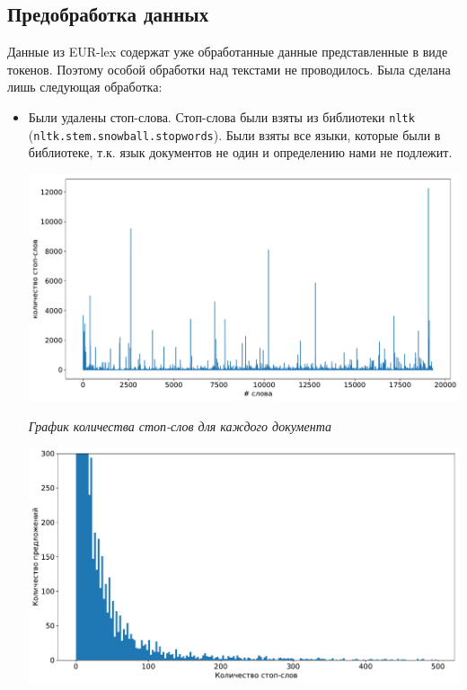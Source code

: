 \documentclass[12pt, a4paper]{article}
\begin{document}
        \subsection{Предобработка данных}
            Данные из EUR-lex содержат уже обработанные данные представленные в виде токенов. Поэтому особой обработки над текстами не проводилось. Была сделана лишь следующая обработка:
            \begin{itemize}
                \item Были удалены стоп-слова. Стоп-слова были взяты из библиотеки \verb|nltk|\\
                (\verb|nltk.stem.snowball.stopwords|). Были взяты все языки, которые были в библиотеке, т.к. язык документов не один и определению нами не подлежит.

                \begin{singlespace}
                    \begin{center}
                        \includegraphics[width=17cm]{diff.pdf}

                        \textit{График количества стоп-слов для каждого документа}
                    \end{center}

                    \begin{center}
                        \includegraphics[width=17cm]{diff_dist.pdf}


\end{center}
\end{singlespace}
\end{itemize}
\end{document}

